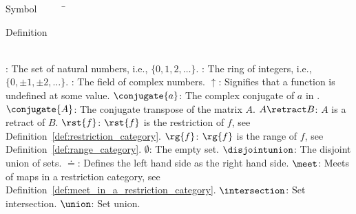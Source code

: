


\begin{tabbing}
Symbol~~~~~\= \ \ \ \ \ \ \ \ \ \ \ \ \ \ \ \ \ \ \ \ \ \ \ \ \ \ \ \ \ \ \ \ \ \ \ \  \parbox{5in}{Definition}\\

\addsymbol \mbox{\nat}: {The set of natural numbers, i.e., $\{0,1,2,\ldots\}$.}
\addsymbol \mbox{\integers}: {The ring of integers, i.e., $\{0,\pm1,\pm2,\ldots\}$.}
\addsymbol \mbox{\complex}: {The field of complex numbers.}
\addsymbol \mbox{$\uparrow$}: {Signifies that a function is undefined at some value.}
\addsymbol \mbox{$\conjugate{a}$}: {The complex conjugate of $a$ in \complex.}
\addsymbol \mbox{$\conjugate{A}$}: {The conjugate transpose of the matrix $A$.}
\addsymbol \mbox{$A\retract B$}: {$A$ is a retract of $B$.}
\addsymbol \mbox{$\rst{f}$}: {$\rst{f}$ is the restriction of $f$, see Definition~\ref{def:restriction_category}.}
\addsymbol \mbox{$\rg{f}$}: {$\rg{f}$ is the range of $f$, see Definition~\ref{def:range_category}.}
\addsymbol \mbox{$\emptyset$}: {The empty set.}
\addsymbol \mbox{$\disjointunion$}: {The disjoint union of sets.}
\addsymbol \mbox{$\doteq$}: {Defines the left hand side as the right hand side.}
\addsymbol \mbox{$\meet$}: {Meets of maps in a restriction category, see Definition~\ref{def:meet_in_a_restriction_category}.}
\addsymbol \mbox{$\intersection$}: {Set intersection.}
\addsymbol \mbox{$\union$}: {Set union.}
\end{tabbing}

